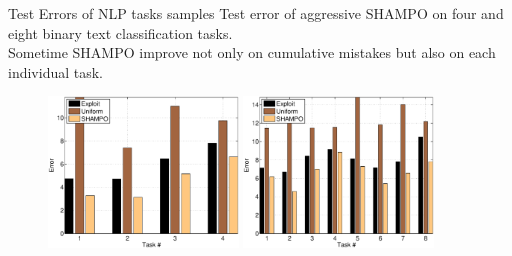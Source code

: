 \documentclass{beamer}
\begin{document}
\begin{frame}{Test Errors of NLP tasks samples}
  Test error of aggressive SHAMPO on four and eight binary text classification tasks. 
\\
Sometime SHAMPO improve not only on cumulative mistakes but also on each individual 
task.
\begin{figure}
\begin{centering}
\includegraphics[width=0.45\textwidth]{figs/problem-9_4_2_2-1.eps}
\includegraphics[width=0.45\textwidth]{figs/problem-9_4_4_4-1.eps}
\end{centering}
\end{figure}
\end{frame}
\end{document}
